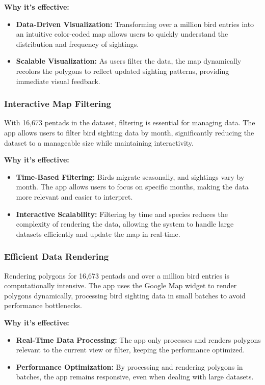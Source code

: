 \documentclass{article}
\begin{document}
\textbf{Why it's effective:}
\begin{itemize}
    \item \textbf{Data-Driven Visualization:} Transforming over a million bird entries into an intuitive color-coded map allows users to quickly understand the distribution and frequency of sightings.
    \item \textbf{Scalable Visualization:} As users filter the data, the map dynamically recolors the polygons to reflect updated sighting patterns, providing immediate visual feedback.
\end{itemize}

\subsubsection{Interactive Map Filtering}
With 16,673 pentads in the dataset, filtering is essential for managing data. The app allows users to filter bird sighting data by month, significantly reducing the dataset to a manageable size while maintaining interactivity.

\textbf{Why it's effective:}
\begin{itemize}
    \item \textbf{Time-Based Filtering:} Birds migrate seasonally, and sightings vary by month. The app allows users to focus on specific months, making the data more relevant and easier to interpret.
    \item \textbf{Interactive Scalability:} Filtering by time and species reduces the complexity of rendering the data, allowing the system to handle large datasets efficiently and update the map in real-time.
\end{itemize}

\subsubsection{Efficient Data Rendering}
Rendering polygons for 16,673 pentads and over a million bird entries is computationally intensive. The app uses the Google Map widget to render polygons dynamically, processing bird sighting data in small batches to avoid performance bottlenecks.

\textbf{Why it's effective:}
\begin{itemize}
    \item \textbf{Real-Time Data Processing:} The app only processes and renders polygons relevant to the current view or filter, keeping the performance optimized.
    \item \textbf{Performance Optimization:} By processing and rendering polygons in batches, the app remains responsive, even when dealing with large datasets.
\end{itemize}
\end{document}
